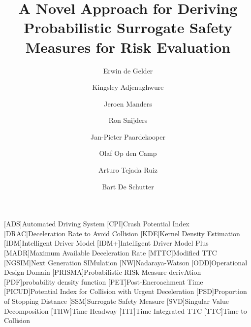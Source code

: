 \documentclass[3p,onecolumn,authoryear]{elsarticle}
\title{\cstarta A Novel \cenda Approach for Deriving Probabilistic Surrogate Safety Measures for Risk Evaluation}
\author[1,2]{Erwin de Gelder\corref{cor1}}
\author[3]{Kingsley Adjenughwure}
\author[1]{Jeroen Manders}
\author[4]{Ron Snijders}
\author[1,5]{Jan-Pieter Paardekooper}
\author[1]{Olaf Op den Camp}
\author[1,6]{Arturo Tejada Ruiz}
\author[1,2]{Bart De Schutter}
\date{}
\begin{document}
\begin{acronym}[AAAAAAAA]
	[ADS]{Automated Driving System}
	[CPI]{Crash Potential Index}
	[DRAC]{Deceleration Rate to Avoid Collision}
	[KDE]{Kernel Density Estimation}
	[IDM]{Intelligent Driver Model}
	[IDM+]{Intelligent Driver Model Plus}
	[MADR]{Maximum Available Deceleration Rate}
	[MTTC]{Modified TTC}
	[NGSIM]{Next Generation SIMulation}
	[NW]{Nadaraya-Watson}
	[ODD]{Operational Design Domain}
	[PRISMA]{Probabilistic RISk Measure derivAtion}
	[PDF]{probability density function}
	[PET]{Post-Encroachment Time}
	[PICUD]{Potential Index for Collision with Urgent Deceleration}
	[PSD]{Proportion of Stopping Distance}
	[SSM]{Surrogate Safety Measure}
	[SVD]{Singular Value Decomposition}
	[THW]{Time Headway}
	[TIT]{Time Integrated TTC}
	[TTC]{Time to Collision}
\end{acronym}



\maketitle
\acresetall




\acresetall







\end{document}
